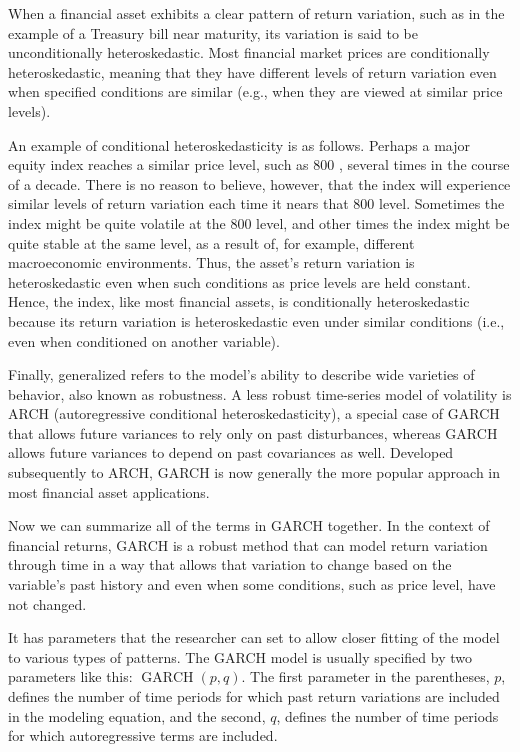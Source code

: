 \documentclass[11pt]{article}
\begin{document}
When a financial asset exhibits a clear pattern of return variation, such as in the example of a Treasury bill near maturity, its variation is said to be unconditionally heteroskedastic. Most financial market prices are conditionally heteroskedastic, meaning that they have different levels of return variation even when specified conditions are similar (e.g., when they are viewed at similar price levels).

An example of conditional heteroskedasticity is as follows. Perhaps a major equity index reaches a similar price level, such as 800 , several times in the course of a decade. There is no reason to believe, however, that the index will experience similar levels of return variation each time it nears that 800 level. Sometimes the index might be quite volatile at the 800 level, and other times the index might be quite stable at the same level, as a result of, for example, different macroeconomic environments. Thus, the asset's return variation is heteroskedastic even when such conditions as price levels are held constant. Hence, the index, like most financial assets, is conditionally heteroskedastic because its return variation is heteroskedastic even under similar conditions (i.e., even when conditioned on another variable).

Finally, generalized refers to the model's ability to describe wide varieties of behavior, also known as robustness. A less robust time-series model of volatility is ARCH (autoregressive conditional heteroskedasticity), a special case of GARCH that allows future variances to rely only on past disturbances, whereas GARCH allows future variances to depend on past covariances as well. Developed subsequently to ARCH, GARCH is now generally the more popular approach in most financial asset applications.

Now we can summarize all of the terms in GARCH together. In the context of financial returns, GARCH is a robust method that can model return variation through time in a way that allows that variation to change based on the variable's past history and even when some conditions, such as price level, have not changed.

It has parameters that the researcher can set to allow closer fitting of the model to various types of patterns. The GARCH model is usually specified by two parameters like this: $\operatorname{GARCH}(p, q)$. The first parameter in the parentheses, $p$, defines the number of time periods for which past return variations are included in the modeling equation, and the second, $q$, defines the number of time periods for which autoregressive terms are included.
\end{document}
